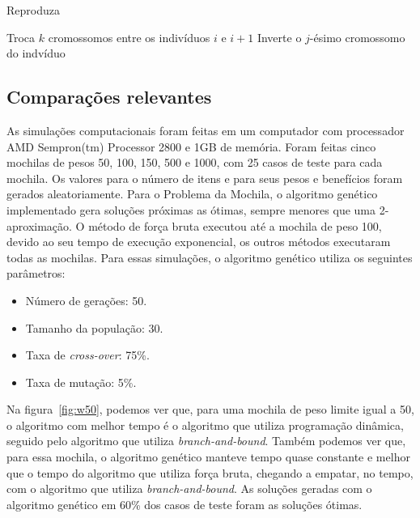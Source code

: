 \begin{algorithm}
\caption{Reproduza} %
\label{alg7}
\scriptsize
\begin{algorithmic}[1]

			\STATE Troca $k$ cromossomos entre os indivíduos $i$ e $i + 1$
		\ENDIF
				\STATE Inverte o $j$-ésimo cromossomo do indvíduo
			\ENDIF
		\ENDFOR
	\ENDFOR

\end{algorithmic}
\end{algorithm}

\newpage

\subsection{Comparações relevantes}

As simulações computacionais foram feitas em um computador com processador AMD Sempron(tm) Processor 2800 e 1GB de memória. Foram feitas cinco mochilas de pesos 50, 100, 150, 500 e 1000, com 25 casos de teste para cada mochila. Os valores para o número de itens e para seus pesos e benefícios foram gerados aleatoriamente. Para o Problema da Mochila, o algoritmo genético implementado gera soluções próximas as ótimas, sempre menores que uma 2-aproximação. O método de força bruta executou até a mochila de peso 100, devido ao seu tempo de execução exponencial, os outros métodos executaram todas as mochilas. Para essas simulações, o algoritmo genético utiliza os seguintes parâmetros:

\begin{itemize}
	\item Número de gerações: 50.
	\item Tamanho da população: 30.
	\item Taxa de \textit{cross-over}: 75\%.
	\item Taxa de mutação: 5\%.
\end{itemize}

Na figura~\ref{fig:w50}, podemos ver que, para uma mochila de peso limite igual a 50, o algoritmo com melhor tempo é o algoritmo que utiliza programação dinâmica, seguido pelo algoritmo que utiliza \textit{branch-and-bound}. Também podemos ver que, para essa mochila, o algoritmo genético manteve tempo quase constante e melhor que o tempo do algoritmo que utiliza força bruta, chegando a empatar, no tempo, com o algoritmo que utiliza \textit{branch-and-bound}. As soluções geradas com o algoritmo genético em 60\% dos casos de teste foram as soluções ótimas.


